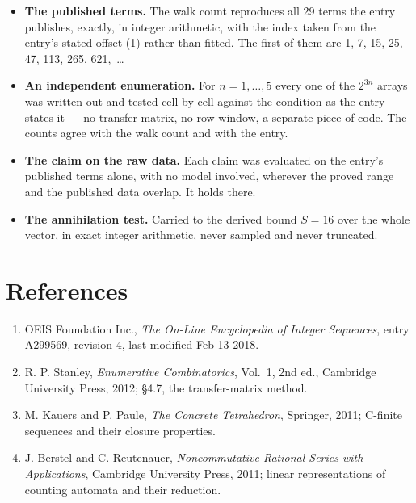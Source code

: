 \documentclass[11pt]{article}
\theoremstyle{definition}
\begin{document}
\begin{itemize}

\item {\bfseries The published terms.} The walk count reproduces all 29 terms the entry publishes, exactly, in integer arithmetic, with the index taken from the entry's stated offset (1) rather than fitted. The first of them are 1, 7, 15, 25, 47, 113, 265, 621,~\dots

\item {\bfseries An independent enumeration.} For $n = 1,\dots,5$ every one of the $2^{3n}$ arrays was written out and tested cell by cell against the condition as the entry states it --- no transfer matrix, no row window, a separate piece of code. The counts agree with the walk count and with the entry.

\item {\bfseries The claim on the raw data.} Each claim was evaluated on the entry's published terms alone, with no model involved, wherever the proved range and the published data overlap. It holds there.

\item {\bfseries The annihilation test.} Carried to the derived bound $S = 16$ over the whole vector, in exact integer arithmetic, never sampled and never truncated.

\end{itemize}

\section{References}

\begin{enumerate}

\item OEIS Foundation Inc., \emph{The On-Line Encyclopedia of Integer Sequences}, entry \href{https://oeis.org/A299569}{A299569}, revision 4, last modified Feb 13 2018.

\item R. P. Stanley, \emph{Enumerative Combinatorics}, Vol.~1, 2nd ed., Cambridge University Press, 2012; \S4.7, the transfer-matrix method.

\item M. Kauers and P. Paule, \emph{The Concrete Tetrahedron}, Springer, 2011; C-finite sequences and their closure properties.

\item J. Berstel and C. Reutenauer, \emph{Noncommutative Rational Series with Applications}, Cambridge University Press, 2011; linear representations of counting automata and their reduction.

\end{enumerate}
\end{document}
